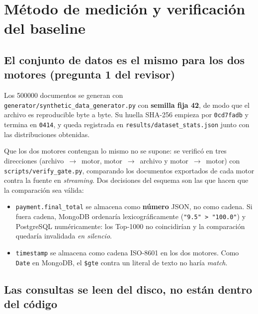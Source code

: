 
\section{Método de medición y verificación del baseline}
\label{sec:metodo}

\subsection{El conjunto de datos es el mismo para los dos motores (pregunta 1 del revisor)}
\label{sec:baseline}

Los \num{500000} documentos se generan con
\texttt{generator/synthetic\_data\_generator.py} con \textbf{semilla fija 42}, de
modo que el archivo es reproducible byte a byte. Su huella SHA-256 empieza por
\texttt{0cd7fadb} y termina en \texttt{0414}, y queda registrada en
\texttt{results/dataset\_stats.json} junto con las distribuciones obtenidas.

Que los dos motores contengan lo mismo no se supone: se verificó en tres
direcciones (archivo~$\to$~motor, motor~$\to$~archivo y motor~$\to$~motor) con
\texttt{scripts/verify\_gate.py}, comparando los documentos exportados de cada
motor contra la fuente en \emph{streaming}. Dos decisiones del esquema son las
que hacen que la comparación sea válida:

\begin{itemize}
  \item \texttt{payment.final\_total} se almacena como \textbf{número} JSON, no
        como cadena. Si fuera cadena, MongoDB ordenaría lexicográficamente
        (\texttt{"9.5" > "100.0"}) y PostgreSQL numéricamente: los Top-1000 no
        coincidirían y la comparación quedaría invalidada \emph{en silencio}.
  \item \texttt{timestamp} se almacena como cadena ISO-8601 en los dos motores.
        Como \texttt{Date} en MongoDB, el \texttt{\$gte} contra un literal de
        texto no haría \emph{match}.
\end{itemize}

\subsection{Las consultas se leen del disco, no están dentro del código}

